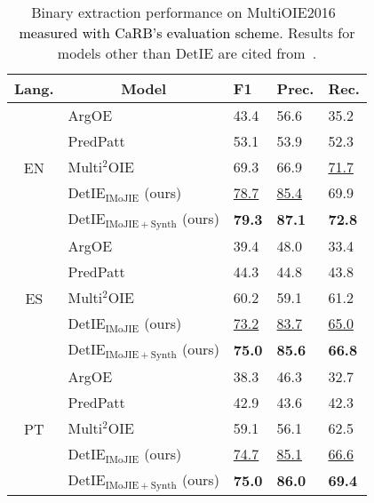 \documentclass[letterpaper]{article} \usepackage{aaai22}  \usepackage{times}  \usepackage{helvet}  \usepackage{courier}  \usepackage[hyphens]{url}  \usepackage{graphicx} \usepackage{placeins}
\newcommand{\added}[1]{\textcolor{black}{#1}}
\begin{document}
\begin{table}[!t]
\centering\small
\begin{tabularx}{\columnwidth}{c|l|XXX}
\toprule
Lang.               & \multicolumn{1}{c|}{Model}
                    & F1 & Prec. & Rec. \\ \hline
    \multirow{5}{*}{EN} & \small ArgOE
                    & 43.4 & 56.6 & 35.2                            \\
                    & \small PredPatt
                    & 53.1 & 53.9 & 52.3                            \\
                    & \small Multi$^2$OIE
                    & 69.3 & 66.9 & \underline{71.7} \\ 
                    & \small DetIE$_\mathrm{IMoJIE}$ (ours)
                    & \underline{78.7} & \underline{85.4} & 69.9 \\
                    & \small DetIE$_\mathrm{IMoJIE+Synth}$ (ours)
                    & \textbf{79.3} & \textbf{87.1} & \textbf{72.8} \\
                    \hline
    \multirow{5}{*}{ES} & \small ArgOE  
                    & 39.4 & 48.0 & 33.4                            \\
                    & \small PredPatt  
                    & 44.3 & 44.8 & 43.8                            \\
                    & \small Multi$^2$OIE 
                    & 60.2 & 59.1 & 61.2 \\ 
                    & \small DetIE$_\mathrm{IMoJIE}$ (ours) 
                    & \underline{73.2} & \underline{83.7} & \underline{65.0} \\
                    & \small DetIE$_\mathrm{IMoJIE+Synth}$ (ours)
                    & \textbf{75.0} & \textbf{85.6} & \textbf{66.8} \\
                    \hline
    \multirow{5}{*}{PT} & \small ArgOE    
                    & 38.3 & 46.3 & 32.7                   \\
                    & \small PredPatt  
                    & 42.9 & 43.6 & 42.3                            \\
                    & \small Multi$^2$OIE
                    & 59.1 & 56.1 & 62.5          \\
                    & \small DetIE$_\mathrm{IMoJIE}$ (ours)
                    & \underline{74.7} & \underline{85.1} & \underline{66.6} \\
                    & \small DetIE$_\mathrm{IMoJIE+Synth}$ (ours)
                    & \textbf{75.0} & \textbf{86.0} & \textbf{69.4} \\
\bottomrule
\end{tabularx}

\caption{Binary extraction performance on MultiOIE2016~\cite{zhan2020span} \added{measured with CaRB’s evaluation scheme}. Results for models other than DetIE are cited from~\cite{ro2020multi}.}
\label{tab:multioie}
\end{table}
\end{document}
